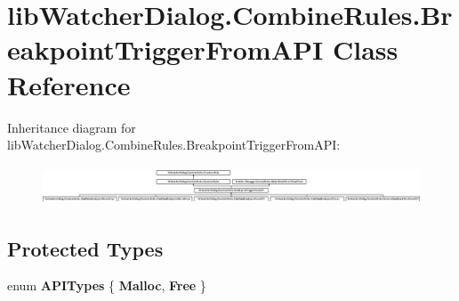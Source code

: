 \hypertarget{classlib_watcher_dialog_1_1_combine_rules_1_1_breakpoint_trigger_from_a_p_i}{\section{lib\+Watcher\+Dialog.\+Combine\+Rules.\+Breakpoint\+Trigger\+From\+A\+P\+I Class Reference}
\label{classlib_watcher_dialog_1_1_combine_rules_1_1_breakpoint_trigger_from_a_p_i}
}
Inheritance diagram for lib\+Watcher\+Dialog.\+Combine\+Rules.\+Breakpoint\+Trigger\+From\+A\+P\+I\+:\begin{figure}[H]
\begin{center}
\leavevmode
\includegraphics[height=1.163636cm]{classlib_watcher_dialog_1_1_combine_rules_1_1_breakpoint_trigger_from_a_p_i}
\end{center}
\end{figure}
\subsection*{Protected Types}
\begin{DoxyCompactItemize}
\item 
\hypertarget{classlib_watcher_dialog_1_1_combine_rules_1_1_breakpoint_trigger_from_a_p_i_aa617373481f4222103f9e5903eca3777}{enum {\bfseries A\+P\+I\+Types} \{ {\bfseries Malloc}, 
{\bfseries Free}
 \}}\label{classlib_watcher_dialog_1_1_combine_rules_1_1_breakpoint_trigger_from_a_p_i_aa617373481f4222103f9e5903eca3777}

\end{DoxyCompactItemize}
